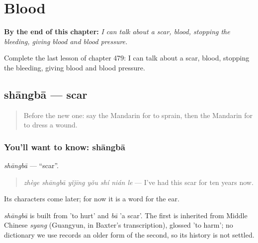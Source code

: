 
\chapter{Blood}
\label{ch:zh-blood}

\begin{chapteropening}
\textbf{By the end of this chapter:} \emph{I can talk about a scar, blood, stopping the bleeding, giving blood and blood pressure.}

Complete the last lesson of chapter 479: I can talk about a scar, blood, stopping the bleeding, giving blood and blood pressure.
\end{chapteropening}

\section[shāngbā]{shāngbā — scar}

\label{lesson:ZH-C479-shangba}



\begin{quote}
Before the new one: say the Mandarin for to sprain, then the Mandarin for to dress a wound.
\end{quote}

\subsection*{You'll want to know: shāngbā}
\emph{shāngbā} — \textquotedblleft{}scar\textquotedblright{}.

\begin{quote}
\emph{zhège shāngbā yǐjīng yǒu shí nián le} — I've had this scar for ten years now.
\end{quote}

Its characters come later; for now it is a word for the ear.

\begin{cousinweb}
\emph{shāngbā} is built from  'to hurt' and \emph{bā} 'a scar'. The first is inherited from Middle Chinese \emph{syang} (Guangyun, in Baxter's transcription), glossed 'to harm'; no dictionary we use records an older form of the second, so its history is not settled.
\end{cousinweb}

